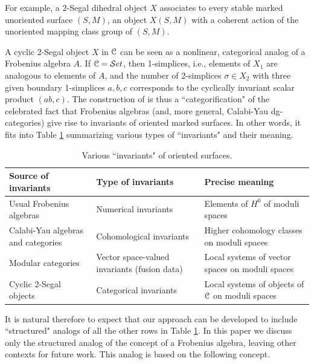 \documentclass[english,11pt,leqno]{article}
\def\Set{ {\mathcal Set}}
\def\C{{\EuScript C}}
\def\Set{ {\mathcal Set}}
\theoremstyle{definition}
\theoremstyle{remark}
\numberwithin{equation}{section}
\begin{document}
For example, a $2$-Segal dihedral object $X$ associates to every stable
marked unoriented surface $(S,M)$, an object $X(S,M)$ with a coherent 
action of the unoriented mapping class group of $(S,M)$.

A cyclic 2-Segal object $X$ in $\C$ can be seen as a nonlinear, categorical analog of a
Frobenius algebra $A$. If $\C=\Set$, then 1-simplices, i.e., elements of $X_1$ are
analogous to elements of $A$, and the number of 2-simplices $\sigma\in X_2$ with three given
boundary 1-simplices $a,b,c$ corresponds  to the cyclically invariant scalar product $(ab,c)$. The
construction of \cite{HSS-triangulated} is thus a ``categorification" of the celebrated fact that
Frobenius algebras (and, more general, Calabi-Yau dg-categories) give rise to invariants of oriented
marked surfaces.  In other words, it fits into  Table \ref{table:invariants} summarizing various
types of ``invariants" and their meaning. 

\begin{table}
  \renewcommand{\arraystretch}{2}
  \begin{tabular}{ p{5cm} | p{5cm}| p{5cm}  }
  Source of invariants & Type of invariants & Precise meaning
  \\
  \hline\hline
  Usual Frobenius algebras & Numerical invariants & Elements of $H^0$ of moduli spaces
    \\ 
    \hline
    Calabi-Yau algebras and categories & Cohomological invariants &  Higher cohomology classes on
    moduli
    spaces  \cite{kontsevich-feynman}\cite{costello-TFT}
 \\ 
    \hline 
    Modular categories & Vector space-valued invariants (fusion data)
    & Local systems of vector spaces on moduli spaces
    \cite{bakalov-kirillov}
      \\ 
    \hline
    Cyclic 2-Segal objects & Categorical invariants & Local systems of objects of $\C$ on moduli spaces
    \\
    \hline
    \end{tabular}
       \caption{ 
       Various ``invariants" of oriented surfaces.}\label{table:invariants}
\end{table}

It is natural therefore to expect that our approach can be developed to include  ``structured"
analogs of all the other rows in Table \ref{table:invariants}. In this paper we discuss only the
structured analog of the concept of a Frobenius algebra, leaving other contexts for future work.
This analog is based on the following concept.
\end{document}
